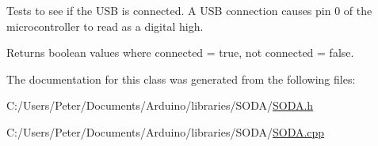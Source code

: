 Tests to see if the U\-S\-B is connected. A U\-S\-B connection causes pin 0 of the microcontroller to read as a digital high. \begin{DoxyReturn}{Returns}
boolean values where connected = true, not connected = false. 
\end{DoxyReturn}


The documentation for this class was generated from the following files\-:\begin{DoxyCompactItemize}
\item 
C\-:/\-Users/\-Peter/\-Documents/\-Arduino/libraries/\-S\-O\-D\-A/\hyperlink{_s_o_d_a_8h}{S\-O\-D\-A.\-h}\item 
C\-:/\-Users/\-Peter/\-Documents/\-Arduino/libraries/\-S\-O\-D\-A/\hyperlink{_s_o_d_a_8cpp}{S\-O\-D\-A.\-cpp}\end{DoxyCompactItemize}
